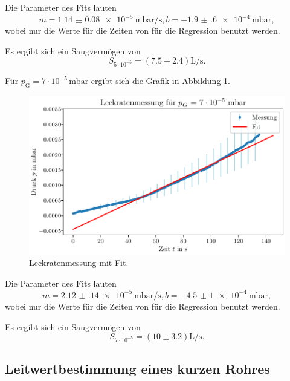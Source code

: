 Die Parameter des Fits lauten 
\begin{equation}
    m = \qty{1.14(8)e-5}{\milli\bar\per\second}, b = \qty{-1.9(6)e-4}{\milli\bar},
\end{equation}
wobei nur die Werte für die Zeiten von %
für die Regression benutzt werden.

Es ergibt sich ein Saugvermögen von
\begin{equation}
    S_{5 \cdot 10^{-5}} = (\num{7.5} \pm \num{2.4}) \si{\liter\per\second}.
\end{equation}

Für $p_\text{G} = 7 \cdot 10^{-5} \, \si{\milli\bar}$ ergibt sich die Grafik in Abbildung \ref{fig:TP_Leck_7e5}.

\begin{figure}[H]
    \centering
    \includegraphics[width=\textwidth]{plots/TP_Leck_7e5.pdf}
    \caption{Leckratenmessung mit Fit.}
    \label{fig:TP_Leck_7e5}
\end{figure}

Die Parameter des Fits lauten 
\begin{equation}
    m = \qty{2.12(14)e-5}{\milli\bar\per\second}, b = \qty{-4.5(10)e-4}{\milli\bar},
\end{equation}
wobei nur die Werte für die Zeiten von %
für die Regression benutzt werden.

Es ergibt sich ein Saugvermögen von
\begin{equation}
    S_{7 \cdot 10^{-5}} = (\num{10} \pm \num{3.2}) \si{\liter\per\second}.
\end{equation}



\subsection{Leitwertbestimmung eines kurzen Rohres}

